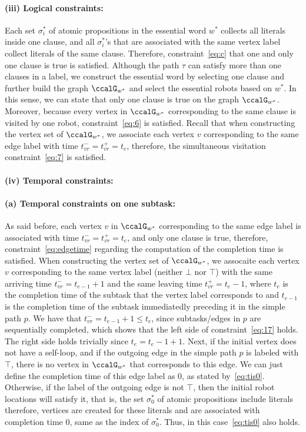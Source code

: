 \documentclass[Afour,sageh,times]{sagej}
\begin{document}
{{{\paragraph{(iii) Logical constraints:} Each set $\sigma^*_i$ of atomic propositions in the essential word $w^*$ collects all literals inside one clause, and all $\sigma^*_i$'s that are associated with the same vertex label collect literals of the same clause. Therefore, constraint~\eqref{eq:c} that one and only one clause is true is satisfied. Although the path $\tau$ can satisfy more than one clauses in a label, we construct the essential word by selecting one clause and further  build the graph $\ccalG_{w^*}$ and select the essential robots based on $w^*$. In this sense, we can state that only one clause is true on the graph $\ccalG_{w^*}$. Moreover, because every vertex in $\ccalG_{w^*}$ corresponding to the same clause is visited by one robot, constraint~\eqref{eq:6} is satisfied. Recall that when constructing the vertex set of $\ccalG_{w^*}$, we associate each vertex $v$ corresponding to the same edge label with time $t_{vr}^- = t_{vr}^+ = t_e$, therefore, the simultaneous visitation constraint~\eqref{eq:7} is satisfied.

\paragraph{(iv) Temporal constraints:}
\paragraph{(a) Temporal constraints on one subtask:} As said before, each vertex $v$ in $\ccalG_{w^*}$ corresponding to the same edge label is associated with time $t_{vr}^- = t_{vr}^+ = t_e$, and only one clause is true, therefore, constraint~\eqref{eq:edgetime} regarding the computation of the completion time is satisfied. When constructing the vertex set of $\ccalG_{w^*}$, we assocaite each vertex $v$ corresponding to the same vertex label (neither $\bot$ nor $\top$) with the same arriving time $t_{vr}^- = t_{e-1}+1$ and the same leaving time $t_{vr}^+ = t_{e}-1$, where $t_e$ is the completion time of the subtask that the vertex label corresponds to and $t_{e-1}$ is the completion time of the subtask immediatedly preceding it in the simple path $p$. We have that $t_{vr}^- = t_{e-1}+1\leq t_e$, since subtasks/edges in $p$ are sequentially completed, which shows that the left side of constraint~\eqref{eq:17} holds. The right side holds trivially since $t_e = t_e-1+1$. Next, if the initial vertex does not have a self-loop, and if the outgoing edge in the simple path $p$ is labeled with $\top$, there is no vertex in $\ccalG_{w^*}$ that corresponds to this edge. We can just define the completion time of this edge label as 0, as stated by~\eqref{eq:tis0}. Otherwise, if the label of the outgoing edge is not $\top$, then the initial robot locations will satisfy it, that is, the set $\sigma^*_0$ of atomic propositions include literals therefore, vertices are created for these literals and are associated with completion time 0, same as the index of $\sigma_0^*$. Thus, in this case~\eqref{eq:tis0} also holds.

}}}
\end{document}
